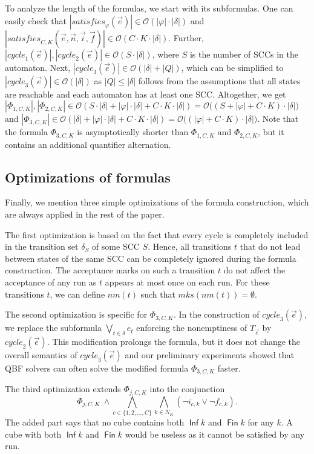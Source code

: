 \documentclass[a4paper,UKenglish,cleveref,autoref,thm-restate]{lipics-v2021}
\DeclareMathOperator{\Inf}{\mathsf{Inf}}
\DeclareMathOperator{\Fin}{\mathsf{Fin}}
\newcommand{\mks}{\mathit{mks}}
\newcommand{\rem}{\mathit{nm}}
\newcommand{\mcycle}{\mathit{cycle}}
\newcommand{\msat}{\mathit{satisfies}}
\newcommand{\Te}{T_{\vec{e}}}
\newcommand{\bigO}{\mathcal{O}}
\begin{document}
To analyze the length of the formulas, we start with its subformulas.
One can easily check that
$|\msat_\varphi(\vec{e})|\in\bigO(|\varphi|\cdot|\delta|)$ and
$|\msat_{C,K}(\vec{e},\vec{n},\vec{i},\vec{f})|\in\bigO(C\cdot
K\cdot|\delta|)$. Further,
$|\mcycle_1(\vec{e})|,|\mcycle_2(\vec{e})|\in\bigO(S\cdot|\delta|)$, %
where $S$ is the number of SCCs in the automaton.  Next,
$|\mcycle_3(\vec{e})|\in\bigO(|\delta|+|Q|)$, which can be simplified
to $|\mcycle_3(\vec{e})|\in\bigO(|\delta|)$ as $|Q|\le|\delta|$
follows from the assumptions that all states are reachable and each
automaton has at least one SCC. Altogether, we get
$|\Phi_{1,C,K}|,|\Phi_{2,C,K}|\in\bigO(S\cdot|\delta|+|\varphi|\cdot|\delta|+C\cdot
K\cdot|\delta|)=\bigO\big((S+|\varphi|+C\cdot K)\cdot|\delta|\big)$
and
$|\Phi_{3,C,K}|\in\bigO(|\delta|+|\varphi|\cdot|\delta|+C\cdot
K\cdot|\delta|)=\bigO\big((|\varphi|+C\cdot K)\cdot|\delta|\big)$.
Note that the formula $\Phi_{3,C,K}$ is asymptotically shorter than
$\Phi_{1,C,K}$ and $\Phi_{2,C,K}$, but it contains an additional quantifier
alternation.

\subsection{Optimizations of formulas}
Finally, we mention three simple optimizations of the formula
construction, which are always applied in the rest of the paper.

The first optimization is based on the fact that every cycle is
completely included in the transition set $\delta_S$ of some SCC
$S$. Hence, all transitions $t$ that do not lead between states of the
same SCC can be completely ignored during the formula
construction. The acceptance marks on such a transition $t$ do not
affect the acceptance of any run as $t$ appears at most once on each
run. For these transitions $t$, we can define $\rem(t)$ such that
$\mks(\rem(t))=\emptyset$.

The second optimization is specific for $\Phi_{3,C,K}$. In the
construction of $\mcycle_3(\vec{e})$, we replace the subformula
$\bigvee_{t\in\delta}e_t$ enforcing the nonemptiness of $\Te$ by
$\mcycle_2(\vec{e})$. This modification prolongs the formula, but it
does not change the overall semantics of $\mcycle_3(\vec{e})$ and our
preliminary experiments showed that QBF solvers can often solve the
modified formula $\Phi_{3,C,K}$ faster.

The third optimization extends $\Phi_{j,C,K}$ into the conjunction
\[
   \Phi_{j,C,K}~\wedge \bigwedge_{c\in\{1,2,\ldots,C\}}\bigwedge_{k\in N_K} (\neg
   i_{c,k}\vee\neg f_{c,k}).
\]
The added part says that no cube contains both $\Inf k$ and $\Fin k$
for any $k$. A cube with both $\Inf k$ and $\Fin k$ would be useless
as it cannot be satisfied by any run.
\end{document}
